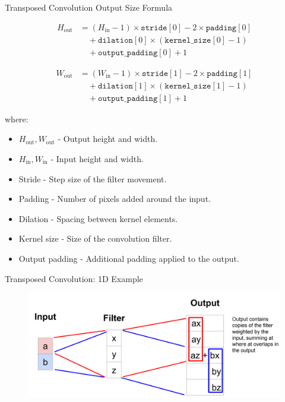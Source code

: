 \documentclass[10pt]{beamer}
\theoremstyle{remark}
\theoremstyle{definition}
\begin{document}
\begin{frame}{Transposed Convolution Output Size Formula}

\small
\begin{equation}
\begin{aligned}
H_{\text{out}} &= (H_{\text{in}} - 1) \times \texttt{stride}[0] - 2 \times \texttt{padding}[0] \\
&\quad + \texttt{dilation}[0] \times (\texttt{kernel\_size}[0] - 1) \\
&\quad + \texttt{output\_padding}[0] + 1
\end{aligned}
\end{equation}

\begin{equation}
\begin{aligned}
W_{\text{out}} &= (W_{\text{in}} - 1) \times \texttt{stride}[1] - 2 \times \texttt{padding}[1] \\
&\quad + \texttt{dilation}[1] \times (\texttt{kernel\_size}[1] - 1) \\
&\quad + \texttt{output\_padding}[1] + 1
\end{aligned}
\end{equation}

\vspace{1em}
where:
\begin{itemize}
    \item  \( H_{\text{out}}, W_{\text{out}} \) - Output height and width.
    \item  \( H_{\text{in}}, W_{\text{in}} \) - Input height and width.
    \item  Stride - Step size of the filter movement.
    \item  Padding - Number of pixels added around the input.
    \item  Dilation - Spacing between kernel elements.
    \item  Kernel size - Size of the convolution filter.
    \item Output padding - Additional padding applied to the output.
\end{itemize}

\end{frame}

\begin{frame}{Transposed Convolution: 1D Example}


\begin{figure}
\centering
\includegraphics[width=1.0\textwidth,height=1.0\textheight,keepaspectratio]{./images/upsample_9.png}
\end{figure}


\end{frame}
\end{document}
